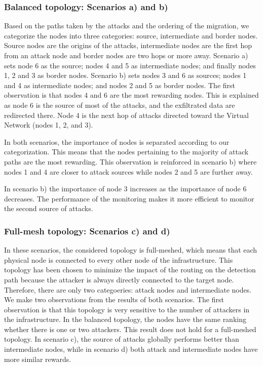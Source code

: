 \subsubsection*{Balanced topology: Scenarios a) and b)}
Based on the paths taken by the attacks and the ordering of the migration, we categorize the nodes into three categories: source, intermediate and border nodes. Source nodes are the origins of the attacks, intermediate nodes are the first hop from an attack node and border nodes are two hops or more away.
Scenario a) sets node 6 as the source; nodes 4 and 5 as intermediate nodes; and finally nodes 1, 2 and 3 as border nodes.
Scenario b) sets nodes 3 and 6 as sources; nodes 1 and 4 as intermediate nodes; and nodes 2 and 5 as border nodes.
The first observation is that nodes 4 and 6 are the most rewarding nodes.
This is explained as node 6 is the source of most of the attacks, and the exfiltrated data are redirected there. Node 4 is the next hop of attacks directed toward the Virtual Network (nodes 1, 2, and 3).

In both scenarios, the importance of nodes is separated according to our categorization. 
This means that the nodes pertaining to the majority of attack paths are the most rewarding.
This observation is reinforced in scenario b) where nodes 1 and 4 are closer to attack sources while nodes 2 and 5 are further away.

In scenario b) the importance of node 3 increases as the importance of node 6 decreases.
The performance of the monitoring makes it more efficient to monitor the second source of attacks.


\subsubsection*{Full-mesh topology: Scenarios c) and d)}
In these scenarios, the considered topology is full-meshed, which means that each physical node is connected to every other node of the infrastructure. This topology has been chosen to minimize the impact of the routing on the detection path because the attacker is always directly connected to the target node.
Therefore, there are only two categoeries: attack nodes and intermediate nodes.
We make two observations from the results of both scenarios.
The first observation is that this topology is very sensitive to the number of attackers in the infrastructure. In the balanced topology, the nodes have the same ranking whether there is one or two attackers. This result does not hold for a full-meshed topology. In scenario c), the source of attacks globally performs better than intermediate nodes, while in scenario d) both attack and intermediate nodes have more similar rewards.

